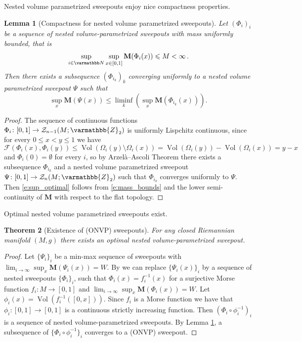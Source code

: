 \documentclass[12pt,twoside]{amsart}
\numberwithin{equation}{section}
\renewcommand{\leq}{\leqslant}
\renewcommand{\mathbb}{\varmathbb}
\newtheorem{theorem}{Theorem}[section]
\newtheorem{lemma}[theorem]{Lemma}
\newcommand{\cF}{\mathcal F}
\newcommand{\bM}{\mathbf{M}}
\DeclareMathOperator{\Vol}{Vol}
\begin{document}
Nested volume parametrized sweepouts enjoy nice compactness properties.

\begin{lemma}[Compactness for nested volume parametrized sweepouts] \label{nested sequence}
	Let $\left( \Phi_i\right)_i$ be a sequence of nested volume-parametrized sweepouts
	with mass uniformly bounded, that is
	\begin{equation}\label{e:mass_bounds}
     \sup_{i\in \mathbb N} \sup_{x\in [0, 1]} \bM(\Phi_i(x))\leq M<\infty\,.
	\end{equation}
	Then there exists a subsequence $\left(\Phi_{i_k}\right)_k$ converging uniformly to a nested volume parametrized sweepout $\Psi$ such that
	\begin{equation}\label{e:sup_optimal}
		\sup_x \bM(\Psi(x)) \leq \liminf_k \left(\sup_x \bM( \Phi_{i_k}(x) )\right).
	\end{equation}
\end{lemma}

\begin{proof} The sequence of continuous functions $\Phi_i\colon [0,1] \to \mathcal{Z}_{n-1}(M; \mathbb{Z}_2)$ is uniformly Lispchitz continuous, since for every $0\leq x<y\leq 1$ we have
	$$
	\cF(\Phi_i(x), \Phi_i(y))\leq \Vol( \Omega_i(y)\setminus\Omega_i(x)) = \Vol(\Omega_i(y))-\Vol(\Omega_i(x))=y-x
	$$
	and $\Phi_i(0)=\emptyset$ for every $i$, so by Arzel\`a--Ascoli Theorem there exists a subsequence $\Phi_{i_k}$ and a nested volume parametrized sweepout $\Psi\colon [0,1] \to \mathcal{Z}_{n}(M; \mathbb{Z}_2)$ such that $\Phi_{i_k}$ converges uniformly to $\Psi$. Then \eqref{e:sup_optimal} follows from \eqref{e:mass_bounds} and the lower semi-continuity of $\bM$ with respect to the flat topology.
\end{proof}


Optimal nested volume parametrized sweepouts exist.


\begin{theorem}[Existence of (ONVP) sweepouts] \label{nested exists}
	For any closed Riemannian manifold $(M,g)$ there exists an optimal 
	nested volume-parametrized sweepout.
\end{theorem}

\begin{proof}
	Let $ \{\Psi_i\}_i$ be a min-max sequence of sweepouts with $\lim_{i \rightarrow \infty }\sup_x \bM(\Psi_i(x)) = W$.
	By \cite[Theorem 1.4]{CL}
	we can replace $\{\Psi_i(x)\}_i$ by a  sequence of nested sweepouts $\{\Phi_i\}_i$, such that $\Phi_i(x) = f_i^{-1}(x)$ for
	a surjective Morse function $f_i: M \rightarrow [0,1]$ and $\lim_{i \rightarrow \infty }\sup_x \bM(\Phi_i(x)) = W$. 
	Let $\phi_i(x) = \Vol (f_i^{-1}([0,x]))$.
	Since $f_i$ is a Morse function we have that $\phi_i: [0,1] \rightarrow [0,1]$ is a continuous strictly increasing function. Then $\left( \Phi_i\circ \phi_i^{-1}\right)_i$ is a sequence
	of nested volume-parametrized sweepouts.
	By Lemma \ref{nested sequence}, a subsequence of $\{ \Phi_i\circ \phi_i^{-1}\}_i$ converges 
	to a (ONVP) sweepout.
\end{proof}
\end{document}
